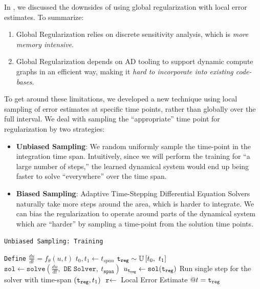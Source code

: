 In , we discussed the downsides of using global regularization with local error estimates. To summarize:
%
\begin{enumerate}
  \item Global Regularization relies on discrete sensitivity analysis, which is \textit{more memory intensive}.

  \item Global Regularization depends on AD tooling to support dynamic compute graphs in an efficient way, making it \textit{hard to incorporate into existing code-bases}.
\end{enumerate}
%
To get around these limitations, we developed a new technique using local sampling of error estimates at specific time points, rather than globally over the full interval. We deal with sampling the ``appropriate'' time point for regularization by two strategies:
%
\begin{itemize}
  \item \textbf{ Unbiased Sampling}: We random uniformly sample the time-point in the integration time span. Intuitively, since we will perform the training for ``a large number of steps,'' the learned dynamical system would end up being faster to solve ``everywhere'' over the time span.

  \item \textbf{ Biased Sampling}: Adaptive Time-Stepping Differential Equation Solvers naturally take more steps around the area, which is harder to integrate. We can bias the regularization to operate around parts of the dynamical system which are ``harder'' by sampling a time-point from the solution time points.
\end{itemize}
%

\begin{algorithm}[t]
  \caption{\texttt{Unbiased Sampling: Training}}
  \label{alg:local_regularization_unbiased_sampling}
  \begin{algorithmic}[1]
    \State \texttt{Define} $\frac{du}{dt} = f_\theta(u, t)$
    \State $t_0, t_1 \gets t_{span}$
    \State $\texttt{t}_{\texttt{reg}} \sim \mathbb{U}\left[t_0,~t_1\right]$
    \State $\texttt{sol} \gets \texttt{solve}(\frac{du}{dt}, \texttt{ DE Solver},~t_{\texttt{span}})$
    \State $u_{\texttt{t}_{\texttt{reg}}} \gets \texttt{sol}(\texttt{t}_{\texttt{reg}})$
    \State Run single step for the solver with time-span $(\texttt{t}_{\texttt{reg}}, t_1)$
    \State $\texttt{r} \gets $ Local Error Estimate $@ t=\texttt{t}_{\texttt{reg}}$
    \State {}
    \EndFunction
  \end{algorithmic}
\end{algorithm}

